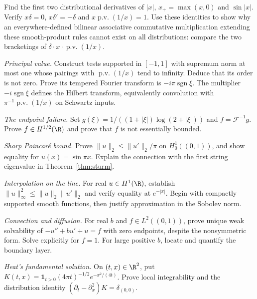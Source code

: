 \begin{exercise}[$\star$]\label{ex:derivabs}
Find the first two distributional derivatives of $|x|$, $x_+=\max(x,0)$ and $\sin|x|$. Verify $x\delta=0$, $x\delta'=-\delta$ and $x\operatorname{p.v.}(1/x)=1$. Use these identities to show why an everywhere-defined bilinear associative commutative multiplication extending these smooth-product rules cannot exist on all distributions: compare the two bracketings of $\delta\cdot x\cdot\operatorname{p.v.}(1/x)$.
\end{exercise}
\begin{exercise}[$\star\star$]\label{ex:pvorder}
\emph{Principal value.} Construct tests supported in $[-1,1]$ with supremum norm at most one whose pairings with $\operatorname{p.v.}(1/x)$ tend to infinity. Deduce that its order is not zero. Prove its tempered Fourier transform is $-i\pi\operatorname{sgn}\xi$. The multiplier $-i\operatorname{sgn}\xi$ defines the Hilbert transform, equivalently convolution with $\pi^{-1}\operatorname{p.v.}(1/x)$ on Schwartz inputs.
\end{exercise}
\begin{exercise}[$\star\star$]\label{ex:loglog}
\emph{The endpoint failure.} Set $g(\xi)=1/((1+|\xi|)\log(2+|\xi|))$ and $f=\mathcal F^{-1}g$. Prove $f\in H^{1/2}(\R)$ and prove that $f$ is not essentially bounded.
\end{exercise}
\begin{exercise}[$\star$]\label{ex:poincare}
\emph{Sharp Poincar\'e bound.} Prove $\|u\|_2\le\|u'\|_2/\pi$ on $H^1_0((0,1))$, and show equality for $u(x)=\sin\pi x$. Explain the connection with the first string eigenvalue in Theorem~\ref{thm:sturm}.
\end{exercise}
\begin{exercise}[$\star$]\label{ex:gagliardo}
\emph{Interpolation on the line.} For real $u\in H^1(\R)$, establish $\|u\|_\infty^2\le\|u\|_2\|u'\|_2$ and verify equality at $e^{-|x|}$. Begin with compactly supported smooth functions, then justify approximation in the Sobolev norm.
\end{exercise}
\begin{exercise}[$\star\star$]\label{ex:convdiff}
\emph{Convection and diffusion.} For real $b$ and $f\in L^2((0,1))$, prove unique weak solvability of $-u''+bu'+u=f$ with zero endpoints, despite the nonsymmetric form. Solve explicitly for $f=1$. For large positive $b$, locate and quantify the boundary layer.
\end{exercise}
\begin{exercise}[$\star\star$]\label{ex:heatfund}
\emph{Heat's fundamental solution.} On $(t,x)\in\R^2$, put $K(t,x)=\mathbf1_{t>0}(4\pi t)^{-1/2}e^{-x^2/(4t)}$. Prove local integrability and the distribution identity $(\partial_t-\partial_x^2)K=\delta_{(0,0)}$.
\end{exercise}

